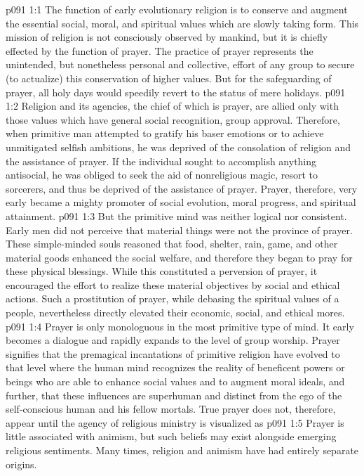 \vs p091 1:1 The function of early evolutionary religion is to conserve and augment the essential social, moral, and spiritual values which are slowly taking form. This mission of religion is not consciously observed by mankind, but it is chiefly effected by the function of prayer. The practice of prayer represents the unintended, but nonetheless personal and collective, effort of any group to secure (to actualize) this conservation of higher values. But for the safeguarding of prayer, all holy days would speedily revert to the status of mere holidays.
\vs p091 1:2 \pc Religion and its agencies, the chief of which is prayer, are allied only with those values which have general social recognition, group approval. Therefore, when primitive man attempted to gratify his baser emotions or to achieve unmitigated selfish ambitions, he was deprived of the consolation of religion and the assistance of prayer. If the individual sought to accomplish anything antisocial, he was obliged to seek the aid of nonreligious magic, resort to sorcerers, and thus be deprived of the assistance of prayer. Prayer, therefore, very early became a mighty promoter of social evolution, moral progress, and spiritual attainment.
\vs p091 1:3 But the primitive mind was neither logical nor consistent. Early men did not perceive that material things were not the province of prayer. These simple\hyp{}minded souls reasoned that food, shelter, rain, game, and other material goods enhanced the social welfare, and therefore they began to pray for these physical blessings. While this constituted a perversion of prayer, it encouraged the effort to realize these material objectives by social and ethical actions. Such a prostitution of prayer, while debasing the spiritual values of a people, nevertheless directly elevated their economic, social, and ethical mores.
\vs p091 1:4 Prayer is only monologuous in the most primitive type of mind. It early becomes a dialogue and rapidly expands to the level of group worship. Prayer signifies that the premagical incantations of primitive religion have evolved to that level where the human mind recognizes the reality of beneficent powers or beings who are able to enhance social values and to augment moral ideals, and further, that these influences are superhuman and distinct from the ego of the self\hyp{}conscious human and his fellow mortals. True prayer does not, therefore, appear until the agency of religious ministry is visualized as 
\vs p091 1:5 \pc Prayer is little associated with animism, but such beliefs may exist alongside emerging religious sentiments. Many times, religion and animism have had entirely separate origins.
